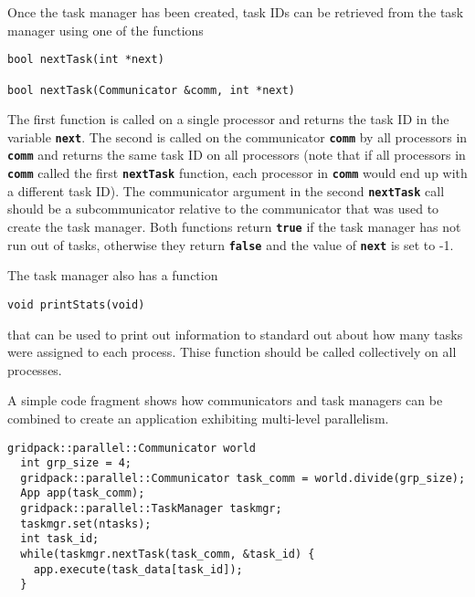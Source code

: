 Once the task manager has been created, task IDs can be retrieved from the task manager using one of the functions

{
\color{red}
\begin{Verbatim}[fontseries=b]
bool nextTask(int *next)

bool nextTask(Communicator &comm, int *next)
\end{Verbatim}
}

The first function is called on a single processor and returns the task ID in
the variable \texttt{\textbf{next}}. The second is called on the communicator
\texttt{\textbf{comm}} by all processors in \texttt{\textbf{comm}} and returns
the same task ID on all processors (note that if all processors in
\texttt{\textbf{comm}} called the first \texttt{\textbf{nextTask}} function,
each processor in \texttt{\textbf{comm}} would end up with a different task ID).
The communicator argument in the second \texttt{\textbf{nextTask}} call should
be a subcommunicator relative to the communicator that was used to create the
task manager. Both functions return \texttt{\textbf{true}} if the task manager
has not run out of tasks, otherwise they return \texttt{\textbf{false}} and the value of \texttt{\textbf{next}} is set to -1.

The task manager also has a function

{
\color{red}
\begin{Verbatim}[fontseries=b]
void printStats(void)
\end{Verbatim}
}

that can be used to print out information to standard out about how many tasks
were assigned to each process. Thise function should be called collectively on
all processes.

A simple code fragment shows how communicators and task managers can be combined to create an application exhibiting multi-level parallelism.

{
\color{red}
\begin{Verbatim}[fontseries=b]
  gridpack::parallel::Communicator world
  int grp_size = 4;
  gridpack::parallel::Communicator task_comm = world.divide(grp_size);
  App app(task_comm);
  gridpack::parallel::TaskManager taskmgr;
  taskmgr.set(ntasks);
  int task_id;
  while(taskmgr.nextTask(task_comm, &task_id) {
    app.execute(task_data[task_id]);
  }
\end{Verbatim}
}

